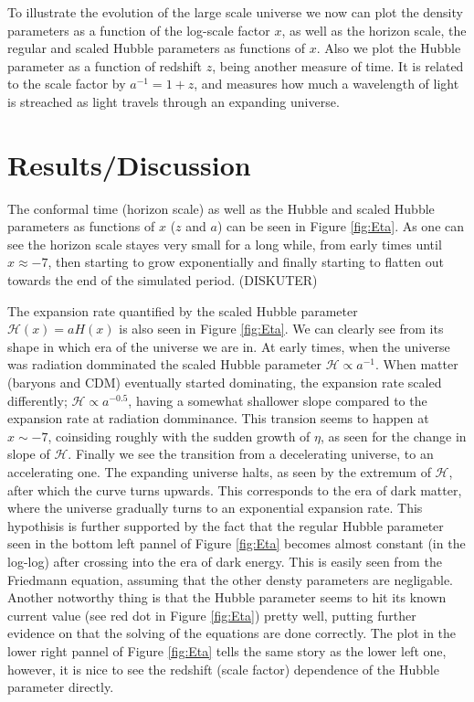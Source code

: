 \documentclass[twocolumn]{aastex62}
\begin{document}
To illustrate the evolution of the large scale universe we now can plot the
density parameters as a function of the log-scale factor $x$, as well as the
horizon scale, the regular and scaled Hubble parameters as functions of $x$.
Also we plot the Hubble parameter as a function of redshift $z$, being another
measure of time. It is related to the scale factor by $a^{-1} = 1 + z$, and
measures how much a wavelength of light is streached as light travels through an
expanding universe.

\section{Results/Discussion}\label{sec:Results}
The conformal time (horizon scale) as well as the Hubble
and scaled Hubble parameters as functions of $x$ ($z$ and $a$) can be seen in
Figure \ref{fig:Eta}. As one can see the horizon scale stayes very small for a
long while, from early times until $x \approx -7$, then starting to grow
exponentially and finally starting to flatten out towards the end of the
simulated period.
(DISKUTER)

The expansion rate quantified by the scaled Hubble parameter $\mathcal{H}(x) =
aH(x)$ is also seen in Figure \ref{fig:Eta}. We can clearly see from its shape
in which era of the universe we are in. At early times, when the universe was
radiation domminated the scaled Hubble parameter $\mathcal{H} \propto a^{-1}$.
When matter (baryons and CDM) eventually started dominating, the expansion rate
scaled differently; $\mathcal{H}\propto a^{-0.5}$, having a somewhat shallower
slope compared to the expansion rate at radiation domminance. This transion
seems to happen at $x\sim -7$, coinsiding roughly with the sudden growth of
$\eta$, as seen for the change in slope of $\mathcal{H}$. Finally we see the
transition from a decelerating universe, to an accelerating one. The expanding
universe halts, as seen by the extremum of $\mathcal{H}$, after which the curve
turns upwards. This corresponds to the era of dark matter, where the universe
gradually turns to an exponential expansion rate. This hypothisis is further
supported by the fact that the regular Hubble parameter seen in the bottom left
pannel of Figure \ref{fig:Eta} becomes almost constant (in the log-log) after
crossing into the era of dark energy. This is easily seen from the Friedmann
equation, assuming that the other densty parameters are negligable. Another
notworthy thing is that the Hubble parameter seems to hit its known current
value (see red dot in Figure \ref{fig:Eta}) pretty well, putting further
evidence on that the solving of the equations are done correctly. The plot in the lower right
pannel of Figure \ref{fig:Eta} tells the same story as the lower left one,
however, it is nice to see the redshift (scale factor) dependence of the Hubble
parameter directly.
\end{document}
